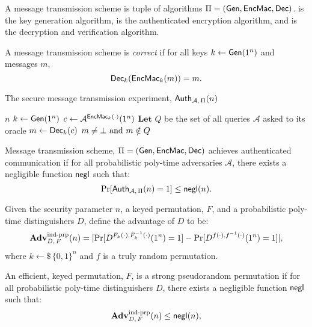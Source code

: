 \documentclass{article}
\begin{document}
\begin{definition}
	A message transmission scheme is tuple of algorithms $\Pi = (\text{\sf Gen}, \text{\sf EncMac}, \text{\sf Dec})$.  is the key generation algorithm,  is the authenticated encryption algorithm, and  is the decryption and verification algorithm.

	A message transmission scheme is \emph{correct} if for all keys $k\gets \text{\sf Gen}(1^n)$ and messages $m$,
	$$\text{\sf Dec}_k(\text{\sf EncMac}_k(m)) = m.$$
\end{definition}

\begin{algorithm}
	\caption{The secure message transmission experiment, $\text{\sf Auth}_{\mathcal{A},\, \Pi}(n)$ \cite{modern_crypto}}\label{alg:header_auth}
	\begin{algorithmic}
		\Require $n$
		\State $k \gets \text{\sf Gen}(1^n)$
		\State $c \gets \mathcal{A}^{\text{\sf EncMac}_k(\cdot)}(1^n)$
		\State $\textbf{Let } Q$ be the set of all queries $\mathcal{A}$ asked to its oracle
		\State $m \gets \text{\sf Dec}_k(c)$
		\Ensure $m \neq \bot \text{ and } m \notin Q$
	\end{algorithmic}
\end{algorithm}

\begin{definition}
	Message transmission scheme, $\Pi = (\text{\sf Gen}, \text{\sf EncMac}, \text{\sf Dec})$ achieves authenticated communication if for all probabilistic poly-time adversaries $\mathcal{A}$, there exists a negligible function $\text{\sf negl}$ such that:
	$$\text{Pr}[\text{\sf Auth}_{\mathcal{A},\, \Pi}(n) = 1] \leq \text{\sf negl}(n).$$
\end{definition}

\begin{definition}
	Given the security parameter $n$, a keyed permutation, $F$, and a probabilistic poly-time distinguishers $D$, define the advantage of $D$ to be:
	$$\mathbf{Adv}^\text{ind-prp}_{D,\,F}(n) = |\text{Pr}[D^{F_k(\cdot), F_k^{-1}(\cdot)}(1^n) = 1] - \text{Pr}[D^{f(\cdot), f^{-1}(\cdot)}(1^n) = 1]|,$$
	where $k\gets\$\,\{0,1\}^n$ and $f$ is a truly random permutation.

	An efficient, keyed permutation, $F$, is a strong pseudorandom permutation if for all probabilistic poly-time distinguishers $D$, there exists a negligible function $\text{\sf negl}$ such that:
	$$\mathbf{Adv}^\text{ind-prp}_{D,\,F}(n) \leq \text{\sf negl}(n),$$
\end{definition}
\end{document}
